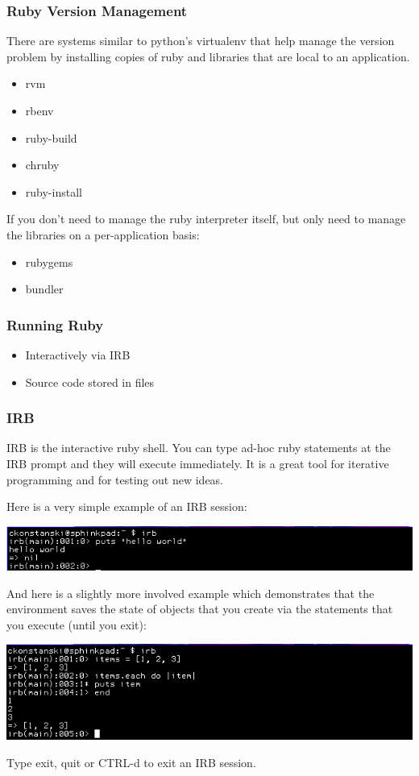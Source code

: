 \documentclass[helvetica,english,utf8,notitle,nologo]{beamer}
\begin{document}
\begin{frame}
  \frametitle{Ruby Version Management}

  There are systems similar to python's virtualenv that help manage
  the version problem by installing copies of ruby and libraries that
  are local to an application.

  \begin{itemize}
  \item rvm
  \item rbenv
  \item ruby-build
  \item chruby
  \item ruby-install
  \end{itemize}

  If you don't need to manage the ruby interpreter itself, but only
  need to manage the libraries on a per-application basis:

  \begin{itemize}
  \item rubygems
  \item bundler
  \end{itemize}
\end{frame}

\begin{frame}
  \frametitle{Running Ruby}
  \begin{itemize}
  \item Interactively via IRB
  \item Source code stored in files
  \end{itemize}
\end{frame}

\begin{frame}
  \frametitle{IRB}

  IRB is the interactive ruby shell. You can type ad-hoc ruby
  statements at the IRB prompt and they will execute immediately. It
  is a great tool for iterative programming and for testing out new
  ideas.

  Here is a very simple example of an IRB session:

  \includegraphics[scale=0.5]{irb_1}

  And here is a slightly more involved example which demonstrates that
  the environment saves the state of objects that you create via the
  statements that you execute (until you exit):

  \includegraphics[scale=0.5]{irb_2}

  Type exit, quit or CTRL-d to exit an IRB session.
\end{frame}
\end{document}
